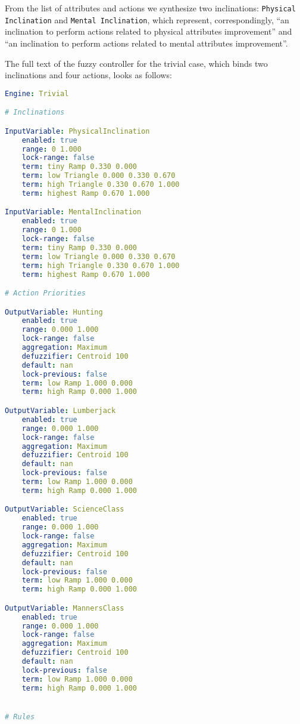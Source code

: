 \documentclass[12pt, a4paper]{article}
\begin{document}
	From the list of attributes and actions we synthesize two inclinations: \texttt{Physical Inclination} and \texttt{Mental Inclination}, which represent, correspondingly, ``an inclination to perform actions related to physical attributes improvement'' and ``an inclination to perform actions related to mental attributes improvement''.
	
	The full text of the fuzzy controller for the trivial case, which binds two inclinations and four actions, looks as follows:
	
	\begin{lstlisting}[language=yaml]
Engine: Trivial

# Inclinations

InputVariable: PhysicalInclination
	enabled: true
	range: 0 1.000
	lock-range: false
	term: tiny Ramp 0.330 0.000 
	term: low Triangle 0.000 0.330 0.670
	term: high Triangle 0.330 0.670 1.000
	term: highest Ramp 0.670 1.000

InputVariable: MentalInclination
	enabled: true
	range: 0 1.000
	lock-range: false
	term: tiny Ramp 0.330 0.000 
	term: low Triangle 0.000 0.330 0.670
	term: high Triangle 0.330 0.670 1.000
	term: highest Ramp 0.670 1.000

# Action Priorities

OutputVariable: Hunting
	enabled: true
	range: 0.000 1.000
	lock-range: false
	aggregation: Maximum
	defuzzifier: Centroid 100
	default: nan
	lock-previous: false
	term: low Ramp 1.000 0.000
	term: high Ramp 0.000 1.000

OutputVariable: Lumberjack
	enabled: true
	range: 0.000 1.000
	lock-range: false
	aggregation: Maximum
	defuzzifier: Centroid 100
	default: nan
	lock-previous: false
	term: low Ramp 1.000 0.000
	term: high Ramp 0.000 1.000

OutputVariable: ScienceClass
	enabled: true
	range: 0.000 1.000
	lock-range: false
	aggregation: Maximum
	defuzzifier: Centroid 100
	default: nan
	lock-previous: false
	term: low Ramp 1.000 0.000
	term: high Ramp 0.000 1.000

OutputVariable: MannersClass
	enabled: true
	range: 0.000 1.000
	lock-range: false
	aggregation: Maximum
	defuzzifier: Centroid 100
	default: nan
	lock-previous: false
	term: low Ramp 1.000 0.000
	term: high Ramp 0.000 1.000


# Rules


\end{lstlisting}
\end{document}
